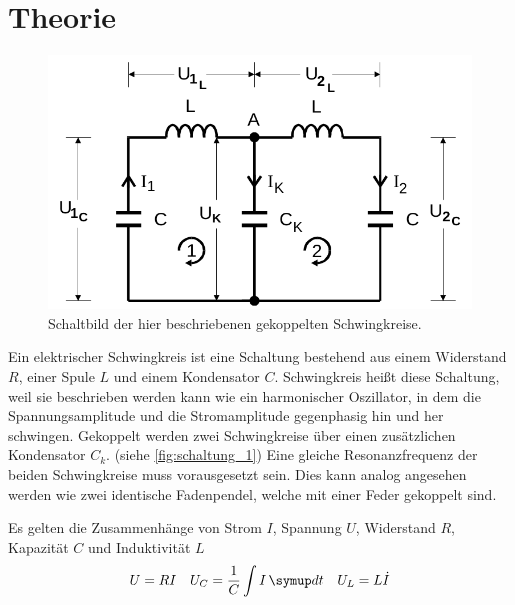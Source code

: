 \section{Theorie}
\label{sec:Theorie}




\begin{figure}
    \centering
    \includegraphics[width=\textwidth/2]{images/schaltung_1.png}
    \caption{Schaltbild der hier beschriebenen gekoppelten Schwingkreise. \cite{V355}}
    \label{fig:schaltung_1}
\end{figure}

Ein elektrischer Schwingkreis ist eine Schaltung bestehend aus einem Widerstand $R$, einer Spule $L$ und einem Kondensator $C$. 
Schwingkreis heißt diese Schaltung, weil sie beschrieben werden kann wie ein harmonischer Oszillator, in dem die Spannungsamplitude und die Stromamplitude gegenphasig hin und her schwingen.
Gekoppelt werden zwei Schwingkreise über einen zusätzlichen Kondensator $C_k$. (siehe \autoref{fig:schaltung_1})
Eine gleiche Resonanzfrequenz der beiden Schwingkreise muss vorausgesetzt sein. 
Dies kann analog angesehen werden wie zwei identische Fadenpendel, welche mit einer Feder gekoppelt sind.

Es gelten die Zusammenhänge von Strom $I$, Spannung $U$, Widerstand $R$, Kapazität $C$ und Induktivität $L$
\begin{align}
    U = RI && U_C = \frac{1}{C} \int I \dif{t} && U_L = L \dot{I}
\end{align}

